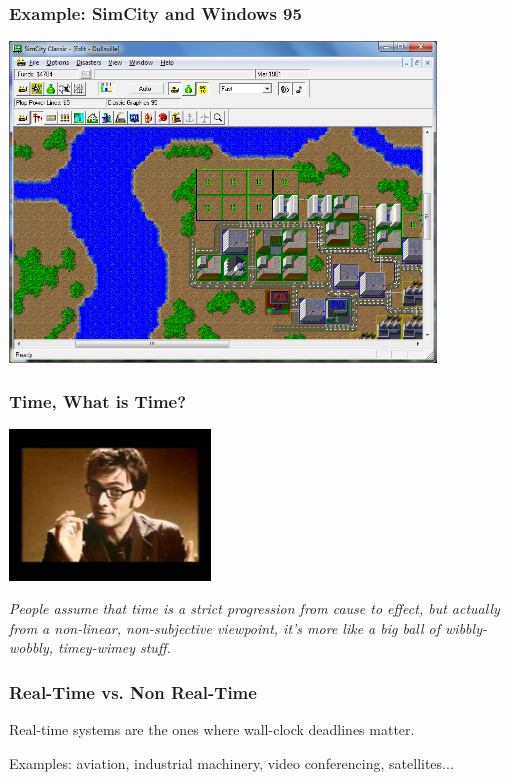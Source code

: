 \begin{frame}
\frametitle{Example: SimCity and Windows 95}

\begin{center}
	\includegraphics[width=0.85\textwidth]{images/simcity.png}
\end{center}

\end{frame}


\begin{frame}
\frametitle{Time, What is Time?}

\begin{center}
	\includegraphics[width=0.4\textwidth]{images/10thdoctor.jpg}
\end{center}

\textit{People assume that time is a strict progression from cause to effect, but actually from a non-linear, non-subjective viewpoint, it's more like a big ball of wibbly-wobbly, timey-wimey stuff.}


\end{frame}



\begin{frame}
\frametitle{Real-Time vs. Non Real-Time}

Real-time systems are the ones where wall-clock deadlines matter.

Examples: aviation, industrial machinery, video conferencing, satellites...

\end{frame}

